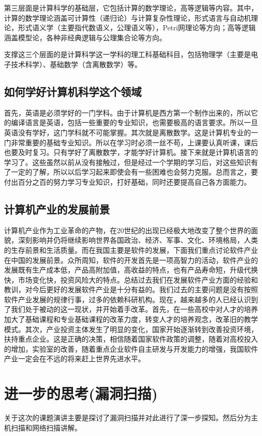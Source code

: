 \documentclass{article}
\begin{document}
第三层面是计算科学的基础层，它包括计算的数学理论，高等逻辑等内容。其中，计算的数学理论涵盖可计算性（递归论）与计算复杂性理论，形式语言与自动机理论，形式语义学（主要指代数语义，公理语义等），Petri网理论等方向；高等逻辑涵盖模型论，各种非经典逻辑与公理集合论等方向。

支撑这三个层面的是计算科学这一学科的理工科基础科目，包括物理学（主要是电子技术科学）、基础数学（含离散数学）等。
\subsection{如何学好计算机科学这个领域}
首先，英语是必须学好的一门学科。由于计算机是西方第一个制作出来的，所以它的编译语言是英语，包括一些重要的专业知识，也需要极高的语言要求。所以一旦英语没有学好，这门学科就不可能掌握。其次就是离散数学。这是计算机专业的一门非常重要的基础专业知识。所以在学习时必须一丝不苟，上课要认真听课，课后也要及时复习。只有学好了离散数学，才能学好计算机。接下来就是计算机语言的学习了。这些虽然以前从没有接触过，但是经过一个学期的学习后，对这些知识有了一定的了解，所以以后学习起来即使会有一些困难也会努力克服。总而言之，要付出百分之百的努力学习专业知识，打好基础，同时还要提高自己各方面能力。
\subsection{计算机产业的发展前景}
计算机产业作为工业革命的产物，在20世纪的出现已经极大地改变了整个世界的面貌，深刻影响并仍将继续影响世界各国政治、经济、军事、文化、环境格局，人类的生存前景和生活质量。而在我国主要是软件的发展，下面我们重点讨论软件产业在中国的发展前景。众所周知，软件的开发首先是一项高智力的活动，软件产业的发展既有生产成本低，产品高附加值，高收益的特点，也有产品寿命短，升级代换快，市场变化快，投资风险大的特点。总结过去我们在发展软件产业方面的经验和教训，对今后更好的发展软件产业是十分有益的。我们过去的主要问题是没有按照软件产业发展的规律行事，过多的依赖科研机构。现在，越来越多的人已经认识到了我们处于被动的这一现状，并开始着手改革。首先，在一些高校中对人才的培养加大了基础课程和专业基础课程的改革力度，转变人才的培养观念，改革旧的教学模式。其次，产业投资主体发生了明显的变化，国家开始逐渐转到改善投资环境，扶持重点企业。这是正确的决策，相信随着国家软件政策的调整，随着对高校投入的增加，实验室的改善，随着重点企业软件自主研发与开发能力的增强，我国软件产业一定会在不远的将来赶上世界先进水平。
\section{进一步的思考(漏洞扫描)}
关于这次的课题演讲主要是探讨了漏洞扫描并对此进行了深一步探知。然后分为主机扫描和网络扫描讲解。
\end{document}
